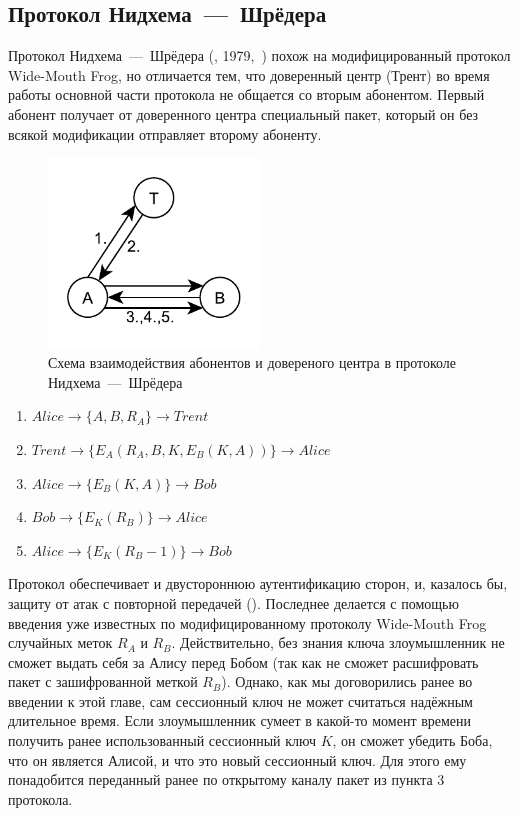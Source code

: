 \subsection{Протокол Нидхема~---~Шрёдера}

Протокол Нидхема~---~Шрёдера (, 1979,~\cite{Needham:Schroeder:1978}) похож на модифицированный протокол Wide-Mouth Frog, но отличается тем, что доверенный центр (Трент) во время работы основной части протокола не общается со вторым абонентом. Первый абонент получает от доверенного центра специальный пакет, который он без всякой модификации отправляет второму абоненту.

\begin{figure}[!htb]
    \centering
    \includegraphics[width=0.5\textwidth]{pic/key_distribution-needham-schroeder}
    \caption{Схема взаимодействия абонентов и довереного центра в протоколе Нидхема~---~Шрёдера\label{fig:key_distribution-needham-schroeder}}
\end{figure}

\begin{enumerate}
	\item $ Alice	\rightarrow \{ A, B, R_A \}						\rightarrow Trent $
	\item $ Trent	\rightarrow \{ E_A \left( R_A, B, K, E_B \left( K, A \right) \right) \}	\rightarrow Alice $
	\item $ Alice	\rightarrow \{ E_B \left( K, A \right) \}				\rightarrow Bob $
	\item $ Bob	\rightarrow \{ E_K \left( R_B \right) \}				\rightarrow Alice $
	\item $ Alice	\rightarrow \{ E_K \left( R_B - 1 \right) \}				\rightarrow Bob $
\end{enumerate}

Протокол обеспечивает и двустороннюю аутентификацию сторон, и, казалось бы, защиту от атак с повторной передачей (). Последнее делается с помощью введения уже известных по модифицированному протоколу Wide-Mouth Frog случайных меток $R_A$ и $R_B$. Действительно, без знания ключа злоумышленник не сможет выдать себя за Алису перед Бобом (так как не сможет расшифровать пакет с зашифрованной меткой $R_B$). Однако, как мы договорились ранее во введении к этой главе, сам сессионный ключ не может считаться надёжным длительное время. Если злоумышленник сумеет в какой-то момент времени получить ранее использованный сессионный ключ $K$, он сможет убедить Боба, что он является Алисой, и что это новый сессионный ключ. Для этого ему понадобится переданный ранее по открытому каналу пакет из пункта 3 протокола.

